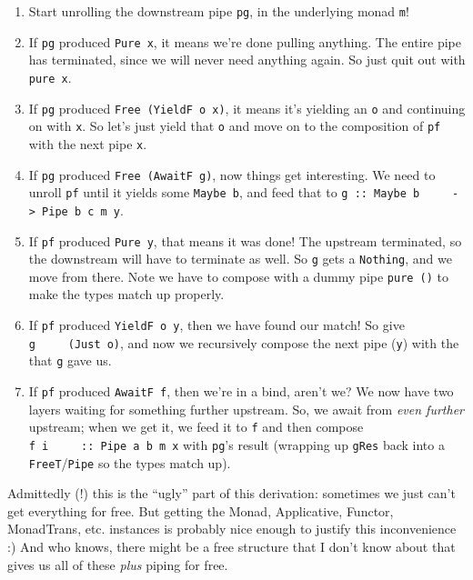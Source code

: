 \documentclass[]{article}
\begin{document}
\begin{enumerate}
\def\labelenumi{\arabic{enumi}.}
\tightlist
\item
  Start unrolling the downstream pipe \texttt{pg}, in the underlying monad
  \texttt{m}!
\item
  If \texttt{pg} produced \texttt{Pure\ x}, it means we're done pulling
  anything. The entire pipe has terminated, since we will never need anything
  again. So just quit out with \texttt{pure\ x}.
\item
  If \texttt{pg} produced \texttt{Free\ (YieldF\ o\ x)}, it means it's yielding
  an \texttt{o} and continuing on with \texttt{x}. So let's just yield that
  \texttt{o} and move on to the composition of \texttt{pf} with the next pipe
  \texttt{x}.
\item
  If \texttt{pg} produced \texttt{Free\ (AwaitF\ g)}, now things get
  interesting. We need to unroll \texttt{pf} until it yields some
  \texttt{Maybe\ b}, and feed that to
  \texttt{g\ ::\ Maybe\ b\ \ \ \ \ -\textgreater{}\ Pipe\ b\ c\ m\ y}.
\item
  If \texttt{pf} produced \texttt{Pure\ y}, that means it was done! The upstream
  terminated, so the downstream will have to terminate as well. So \texttt{g}
  gets a \texttt{Nothing}, and we move from there. Note we have to compose with
  a dummy pipe \texttt{pure\ ()} to make the types match up properly.
\item
  If \texttt{pf} produced \texttt{YieldF\ o\ y}, then we have found our match!
  So give \texttt{g\ \ \ \ \ (Just\ o)}, and now we recursively compose the next
  pipe (\texttt{y}) with the that \texttt{g} gave us.
\item
  If \texttt{pf} produced \texttt{AwaitF\ f}, then we're in a bind, aren't we?
  We now have two layers waiting for something further upstream. So, we await
  from \emph{even further} upstream; when we get it, we feed it to \texttt{f}
  and then compose \texttt{f\ i\ \ \ \ \ ::\ Pipe\ a\ b\ m\ x} with
  \texttt{pg}'s result (wrapping up \texttt{gRes} back into a
  \texttt{FreeT}/\texttt{Pipe} so the types match up).
\end{enumerate}

Admittedly (!) this is the ``ugly'' part of this derivation: sometimes we just
can't get everything for free. But getting the Monad, Applicative, Functor,
MonadTrans, etc. instances is probably nice enough to justify this inconvenience
:) And who knows, there might be a free structure that I don't know about that
gives us all of these \emph{plus} piping for free.
\end{document}

